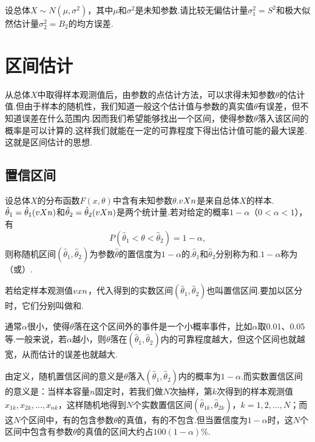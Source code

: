 \begin{example}
设总体\(X \sim N(\mu,\sigma^2)\)，其中\(\mu\)和\(\sigma^2\)是未知参数.请比较无偏估计量\(\sigma_1^2=S^2\)和极大似然估计量\(\sigma_2^2=B_2\)的均方误差.
\end{example}

\section{区间估计}
从总体\(X\)中取得样本观测值后，由参数的点估计方法，可以求得未知参数\(\theta\)的估计值.但由于样本的随机性，我们知道一般这个估计值与参数的真实值\(\theta\)有误差，但不知道误差在什么范围内.因而我们希望能够找出一个区间，使得参数\(\theta\)落入该区间的概率是可以计算的.这样我们就能在一定的可靠程度下得出估计值可能的最大误差.这就是区间估计的思想.

\subsection{置信区间}
\begin{definition}
设总体\(X\)的分布函数\(F(x,\theta)\)中含有未知参数\(\theta\).\(v{X}{n}\)是来自总体\(X\)的样本.\(\hat{\theta}_1=\hat{\theta}_1(v{X}{n})\)和\(\hat{\theta}_2=\hat{\theta}_2(v{X}{n})\)是两个统计量.若对给定的概率\(1-\alpha\)（\(0<\alpha<1\)），有\[
P(\hat{\theta}_1<\theta<\hat{\theta}_2)=1-\alpha,
\]则称随机区间\((\hat{\theta}_1,\hat{\theta}_2)\)为参数\(\hat{\theta}\)的置信度为\(1-\alpha\)的.\(\hat{\theta}_1\)和\(\hat{\theta}_2\)分别称为和.\(1-\alpha\)称为（或）.

若给定样本观测值\(v{x}{n}\)，代入得到的实数区间\((\hat{\theta}_1,\hat{\theta}_2)\)也叫置信区间.要加以区分时，它们分别叫做和.
\end{definition}

通常\(\alpha\)很小，使得\(\theta\)落在这个区间外的事件是一个小概率事件，比如\(\alpha\)取0.01、0.05等.一般来说，若\(\alpha\)越小，则\(\theta\)落在\((\hat{\theta}_1,\hat{\theta}_2)\)内的可靠程度越大，但这个区间也就越宽，从而估计的误差也就越大.

由定义，随机置信区间的意义是\(\theta\)落入\((\hat{\theta}_1,\hat{\theta}_2)\)内的概率为\(1-\alpha\).而实数置信区间的意义是：当样本容量\(n\)固定时，若我们做\(N\)次抽样，第\(k\)次得到的样本观测值\(x_{1k},x_{2k},\dotsc,x_{nk}\)，这样随机地得到\(N\)个实数置信区间\((\hat{\theta}_{1k},\hat{\theta}_{2k})\)，\(k=1,2,\dots,N\)；而这\(N\)个区间中，有的包含参数\(\theta\)的真值，有的不包含.但当置信度为\(1-\alpha\)时，这\(N\)个区间中包含有参数\(\theta\)的真值的区间大约占\(100(1-\alpha)\%\).

